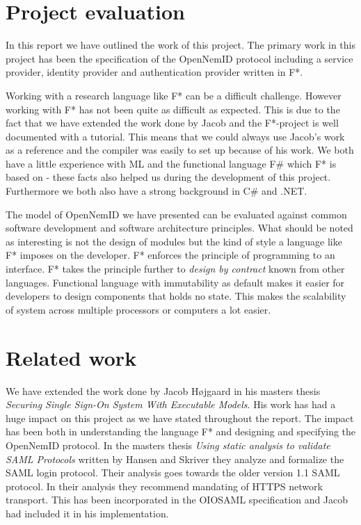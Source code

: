 \documentclass[twosided]{report}
\begin{document}
\section{Project evaluation}
In this report we have outlined the work of this project. The primary work in this project has been the specification of the OpenNemID protocol including a service provider, identity provider and authentication provider written in F*.
\par
Working with a research language like F* can be a difficult challenge. However working with F* has not been quite as difficult as expected. This is due to the fact that we have extended the work done by Jacob and the F*-project is well documented with a tutorial. This means that we could always use Jacob's work as a reference and the compiler was easily to set up because of his work. We both have a little experience with ML and the functional language F\# which F* is based on - these facts also helped us during the development of this project. Furthermore we both also have a strong background in C\# and .NET.
\par
The model of OpenNemID we have presented can be evaluated against common software development and software architecture principles. What should be noted as interesting is not the design of modules but the kind of style a language like F* imposes on the developer. F* enforces the principle of programming to an interface. F* takes the principle further to \emph{design by contract} known from other languages. Functional language with immutability as default makes it easier for developers to design components that holds no state. This makes the scalability of system across multiple processors or computers a lot easier.

\section{Related work}
We have extended the work done by Jacob H{\o}jgaard \cite{jacob} in his masters thesis \emph{Securing Single Sign-On System With Executable Models}. His work has had a huge impact on this project as we have stated throughout the report. The impact has been both in understanding the language F* and designing and specifying the OpenNemID protocol. In the masters thesis \emph{Using static analysis to validate SAML Protocols} written by Hansen and Skriver \cite{HansenSkriver} they analyze and formalize the SAML login protocol. Their analysis goes towards the older version 1.1 SAML protocol. In their analysis they recommend mandating of HTTPS network transport. This has been incorporated in the OIOSAML specification and Jacob had included it in his implementation.
\end{document}
